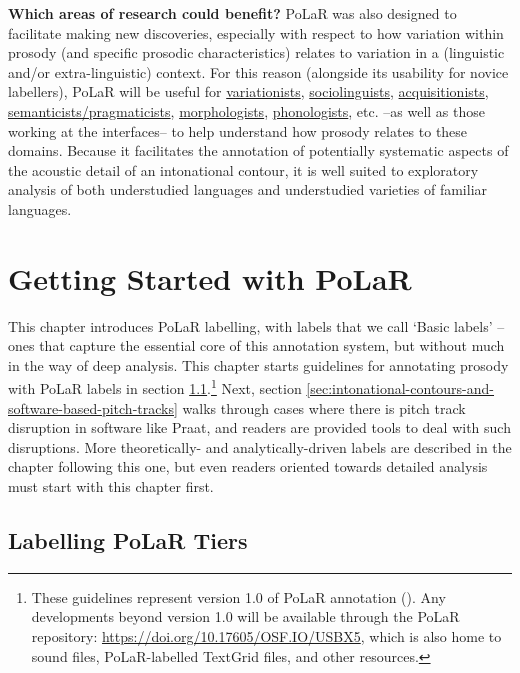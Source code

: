 \documentclass[11pt, twoside]{memoir}
\begin{document}
\textbf{Which areas of research could benefit?} PoLaR was also designed to facilitate making new discoveries, especially with respect to how variation within prosody (and specific prosodic characteristics) relates to variation in a (linguistic and/or extra-linguistic) context. For this reason (alongside its usability for novice labellers), PoLaR will be useful for \uline{variationists}, \uline{sociolinguists}, \uline{acquisitionists}, \uline{semanticists\slash pragmaticists}, \uline{morphologists}, \uline{phonologists}, etc. --as well as those working at the interfaces-- to help understand how prosody relates to these domains. Because it facilitates the annotation of potentially systematic aspects of the acoustic detail of an intonational contour, it is well suited to exploratory analysis of both understudied languages and understudied varieties of familiar languages.





\chapter{Getting Started with PoLaR}\label{ch:basics}

This chapter introduces PoLaR labelling, with labels that we call ‘Basic labels’ – ones that capture the essential core of this annotation system, but without much in the way of deep analysis. This chapter starts guidelines for annotating prosody with PoLaR labels in section  \ref{sec:labelling-polar-tiers}.\footnote{These guidelines represent version 1.0 of PoLaR annotation (\citealt{ahn-21}). Any developments beyond version 1.0 will be available through the PoLaR repository: \href{https://doi.org/10.17605/OSF.IO/USBX5}{https://doi.org/10.17605/OSF.IO/USBX5}, which is also home to sound files, PoLaR-labelled TextGrid files, and other resources.} Next, section \ref{sec:intonational-contours-and-software-based-pitch-tracks} walks through cases where there is pitch track disruption in software like Praat, and readers are provided tools to deal with such disruptions. More theoretically- and analytically-driven labels are described in the chapter following this one, but even readers oriented towards detailed analysis must start with this chapter first.

\section{Labelling PoLaR Tiers}\label{sec:labelling-polar-tiers}
\end{document}
